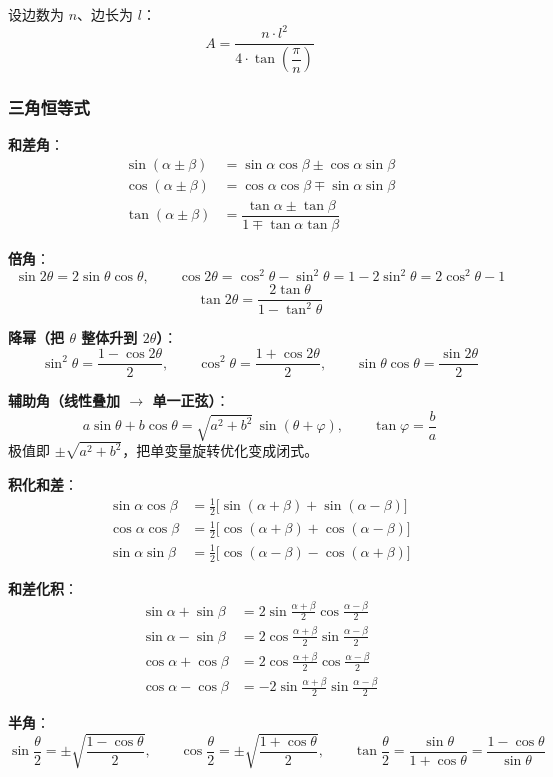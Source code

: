 	设边数为 $n$、边长为 $l$：
	$$
	A = \dfrac{n \cdot l^2}{4 \cdot \tan\!\left(\dfrac{\pi}{n}\right)}
	$$

	\subsubsection{三角恒等式}

	\textbf{和差角}：
	\begin{align*}
		\sin(\alpha \pm \beta) & = \sin\alpha\cos\beta \pm \cos\alpha\sin\beta                                  \\
		\cos(\alpha \pm \beta) & = \cos\alpha\cos\beta \mp \sin\alpha\sin\beta                                  \\
		\tan(\alpha \pm \beta) & = \dfrac{\tan\alpha \pm \tan\beta}{1 \mp \tan\alpha\tan\beta}
	\end{align*}

	\textbf{倍角}：
	$$
	\sin 2\theta = 2\sin\theta\cos\theta, \qquad
	\cos 2\theta = \cos^2\theta - \sin^2\theta = 1 - 2\sin^2\theta = 2\cos^2\theta - 1
	$$
	$$
	\tan 2\theta = \dfrac{2\tan\theta}{1 - \tan^2\theta}
	$$

	\textbf{降幂（把 $\theta$ 整体升到 $2\theta$）}：
	$$
	\sin^2\theta = \dfrac{1 - \cos 2\theta}{2}, \qquad
	\cos^2\theta = \dfrac{1 + \cos 2\theta}{2}, \qquad
	\sin\theta\cos\theta = \dfrac{\sin 2\theta}{2}
	$$

	\textbf{辅助角（线性叠加 $\to$ 单一正弦）}：
	$$
	a\sin\theta + b\cos\theta = \sqrt{a^2 + b^2}\,\sin(\theta + \varphi),
	\qquad \tan\varphi = \dfrac{b}{a}
	$$
	极值即 $\pm\sqrt{a^2 + b^2}$，把单变量旋转优化变成闭式。

	\textbf{积化和差}：
	\begin{align*}
		\sin\alpha\cos\beta & = \tfrac{1}{2}\bigl[\sin(\alpha+\beta) + \sin(\alpha-\beta)\bigr] \\
		\cos\alpha\cos\beta & = \tfrac{1}{2}\bigl[\cos(\alpha+\beta) + \cos(\alpha-\beta)\bigr] \\
		\sin\alpha\sin\beta & = \tfrac{1}{2}\bigl[\cos(\alpha-\beta) - \cos(\alpha+\beta)\bigr]
	\end{align*}

	\textbf{和差化积}：
	\begin{align*}
		\sin\alpha + \sin\beta & = 2\sin\tfrac{\alpha+\beta}{2}\cos\tfrac{\alpha-\beta}{2}  \\
		\sin\alpha - \sin\beta & = 2\cos\tfrac{\alpha+\beta}{2}\sin\tfrac{\alpha-\beta}{2}  \\
		\cos\alpha + \cos\beta & = 2\cos\tfrac{\alpha+\beta}{2}\cos\tfrac{\alpha-\beta}{2}  \\
		\cos\alpha - \cos\beta & = -2\sin\tfrac{\alpha+\beta}{2}\sin\tfrac{\alpha-\beta}{2}
	\end{align*}

	\textbf{半角}：
	$$
	\sin\dfrac{\theta}{2} = \pm\sqrt{\dfrac{1-\cos\theta}{2}}, \qquad
	\cos\dfrac{\theta}{2} = \pm\sqrt{\dfrac{1+\cos\theta}{2}}, \qquad
	\tan\dfrac{\theta}{2} = \dfrac{\sin\theta}{1+\cos\theta} = \dfrac{1-\cos\theta}{\sin\theta}
	$$
	\newpage
